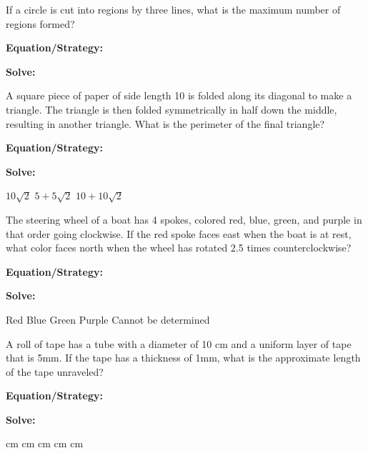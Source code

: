 \vfill
\newpage
\begin{multicols*}{2}
\begin{outline}[enumerate]
\medium

\1 If a circle is cut into regions by three lines, what is the maximum number of regions formed?

\bigskip
\textbf{Equation/Strategy:} \hrulefill

\bigskip
\textbf{Solve:}

\vfill
{}

\midline

\1 A square piece of paper of side length 10 is folded along its diagonal to make a triangle. The triangle is then folded symmetrically in half down the middle, resulting in another triangle. What is the perimeter of the final triangle?

\bigskip
\textbf{Equation/Strategy:} \hrulefill

\bigskip
\textbf{Solve:}

\vfill
{}
\2 $10\sqrt{2}$
\2 $5+5\sqrt{2}$
\2 $10+10\sqrt{2}$

\columnbreak
\advanced

\1 The steering wheel of a boat has 4 spokes, colored red, blue, green, and purple in that order going clockwise. If the red spoke faces east when the boat is at rest, what color faces north when the wheel has rotated 2.5 times counterclockwise?

\bigskip
\textbf{Equation/Strategy:} \hrulefill

\bigskip
\textbf{Solve:}

\vfill
\2 Red
\2 Blue
\2 Green
\2 Purple
\2 Cannot be determined

\midline

\1 A roll of tape has a tube with a diameter of 10 cm and a uniform layer of tape that is 5mm. If the tape has a thickness of 1mm, what is the approximate length of the tape unraveled?

\bigskip
\textbf{Equation/Strategy:}

\bigskip
\textbf{Solve:}

\vfill
{} cm
 cm
 cm
 cm
 cm
\end{outline}
\end{multicols*}